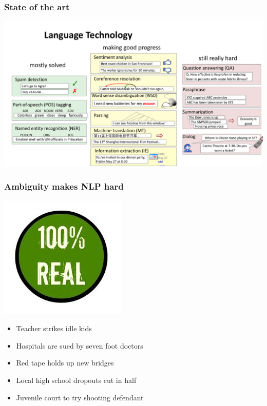 \documentclass[dvipsnames]{beamer}
\begin{document}
\begin{frame}
\frametitle{State of the art}
\noindent
\hspace{-1.17cm}
\includegraphics[scale=0.5]{progress}
\end{frame}

\begin{frame}
\frametitle{Ambiguity makes NLP hard}
\hfill
\includegraphics[scale=0.4]{real}

\begin{itemize}
\vspace{-1cm}
\item Teacher strikes idle kids
\item Hospitals are sued by seven foot doctors
\item Red tape holds up new bridges
\item Local high school dropouts cut in half
\item Juvenile court to try shooting defendant  
\end{itemize}
\end{frame}
\end{document}

